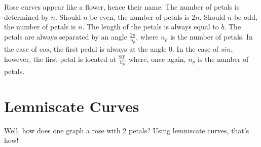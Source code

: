 \documentclass{report}
\begin{document}

    Rose curves appear like a flower, hence their name. The number of petals is determined by $n$. Should $n$ be even, the number of petals is $2n$. Should $n$ be odd, the number of petals is $n$. The length of the petals is always equal to $b$. The petals are always separated by an angle $\frac{2\pi}{n_p}$, where $n_p$ is the number of petals. In the case of $cos$, the first pedal is always at the angle 0. In the case of $sin$, however, the first petal is located at $\frac{90^{\circ}}{n_p}$ where, once again, $n_p$ is the number of petals.


    \section{Lemniscate Curves}

    Well, how does one graph a rose with 2 petals? Using lemniscate curves, that's how!
\end{document}
